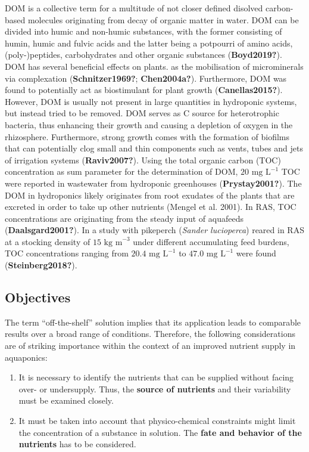 \documentclass[
]{article}
\providecommand{\tightlist}{%
  \setlength{\itemsep}{0pt}\setlength{\parskip}{0pt}}
\begin{document}
DOM is a collective term for a multitude of not closer defined disolved carbon-based molecules originating from decay of organic matter in water. DOM can be divided into humic and non-humic substances, with the former consisting of humin, humic and fulvic acids and the latter being a potpourri of amino acids, (poly-)peptides, carbohydrates and other organic substances (\textbf{Boyd2019?}). DOM has several beneficial effects on plants. as the mobilisation of microminerals via complexation (\textbf{Schnitzer1969?}; \textbf{Chen2004a?}). Furthermore, DOM was found to potentially act as biostimulant for plant growth (\textbf{Canellas2015?}). However, DOM is usually not present in large quantities in hydroponic systems, but instead tried to be removed. DOM serves as C source for heterotrophic bacteria, thus enhancing their growth and causing a depletion of oxygen in the rhizosphere. Furthermore, strong growth comes with the formation of biofilms that can potentially clog small and thin components such as vents, tubes and jets of irrigation systems (\textbf{Raviv2007?}). Using the total organic carbon (TOC) concentration as sum parameter for the determination of DOM, \(20 \text{ mg L}^{-1}\) TOC were reported in wastewater from hydroponic greenhouses (\textbf{Prystay2001?}). The DOM in hydroponics likely originates from root exudates of the plants that are excreted in order to take up other nutrients (Mengel et al. 2001). In RAS, TOC concentrations are originating from the steady input of aquafeeds (\textbf{Daalsgard2001?}). In a study with pikeperch (\emph{Sander lucioperca}) reared in RAS at a stocking density of \(15 \text{ kg m}^{-3}\) under different accumulating feed burdens, TOC concentrations ranging from \(20.4 \text{ mg L}^{-1}\) to \(47.0 \text{ mg L}^{-1}\) were found (\textbf{Steinberg2018?}).

\hypertarget{objectives}{%
\subsection{Objectives}\label{objectives}}

The term ``off-the-shelf'' solution implies that its application leads to comparable results over a broad range of conditions. Therefore, the following considerations are of striking importance within the context of an improved nutrient supply in aquaponics:

\begin{enumerate}
\def\labelenumi{\arabic{enumi}.}
\tightlist
\item
  It is necessary to identify the nutrients that can be supplied without facing over- or undersupply. Thus, the \textbf{source of nutrients} and their variability must be examined closely.
\item
  It must be taken into account that physico-chemical constraints might limit the concentration of a substance in solution. The \textbf{fate and behavior of the nutrients} has to be considered.
\end{enumerate}
\end{document}
